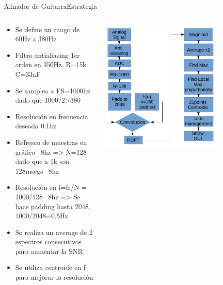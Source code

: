 \begin{frame}[t]{Afinador de Guitarra}{Estrategia}
   \footnotesize
   \begin{columns}
      \begin{column}{.5\textwidth}
         \begin{itemize}
            \item{Se define un rango de 60Hz a 380Hz}
            \item{Filtro antialiasing 1er orden en 350Hz. R=15k C=33nF}
            \item{Se samplea a FS=1000hz dado que 1000/2>380}
            \item{Resolución en frecuencia deseada 0.1hz}
            \item{Refresco de muestras en gráfico ~8hz => N=128 dado que a 1k son 128msegs ~8hz}
            \item{Resolución en f=fs/N = 1000/128 ~8hz => Se hace padding hasta 2048. 1000/2048=0.5Hz}
            \item{Se realiza un average de 2 espectros consecutivos para aumentar la SNR}
            \item{Se utiliza centroide en f para mejorar la resolución}
         \end{itemize}
      \end{column}
      \begin{column}{.5\textwidth}
         \center\includegraphics[width=0.8\textwidth]{7_clase/bloques}
      \end{column}
   \end{columns}
   \vfill
   \note{
      \begin{itemize}
         \item{}
         \item{}
      \end{itemize}
   }
\end{frame}
